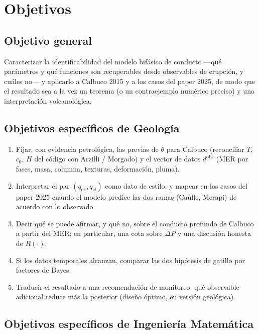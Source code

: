 \documentclass[11pt,a4paper]{article}
\theoremstyle{plain}
\theoremstyle{definition}
\theoremstyle{remark}
\newcommand{\MER}{\mathrm{MER}}
\begin{document}
\section{Objetivos}
\label{sec:objetivos}

\subsection{Objetivo general}

Caracterizar la identificabilidad del modelo bifásico de conducto
---qué parámetros y qué funciones son recuperables desde
observables de erupción, y cuáles no--- y aplicarlo a Calbuco 2015
y a los casos del paper 2025, de modo que el resultado sea a la
vez un teorema (o un contraejemplo numérico preciso) y una
interpretación volcanológica.

\subsection{Objetivos específicos de Geología}

\begin{enumerate}[label=G\arabic*.]
\item Fijar, con evidencia petrológica, las previas de
  $\theta$ para Calbuco (reconciliar $T$, $c_0$, $H$ del código
  con Arzilli / Morgado) y el vector de datos
  $d^{\mathrm{obs}}$ (MER por fases, masa, columna, texturas,
  deformación, pluma).
\item Interpretar el par $(q_{\mathrm{ex}},q_{\mathrm{ef}})$ como
  dato de estilo, y mapear en los casos del paper 2025 cuándo el
  modelo predice las dos ramas (Caulle, Merapi) de acuerdo con lo
  observado.
\item Decir qué se puede afirmar, y qué no, sobre el conducto
  profundo de Calbuco a partir del $\MER$; en particular, una
  cota sobre $\Delta P$ y una discusión honesta de $R(\cdot)$.
\item Si los datos temporales alcanzan, comparar las dos
  hipótesis de gatillo por factores de Bayes.
\item Traducir el resultado a una recomendación de monitoreo:
  qué observable adicional reduce más la posterior (diseño
  óptimo, en versión geológica).
\end{enumerate}

\subsection{Objetivos específicos de Ingeniería Matemática}
\end{document}
